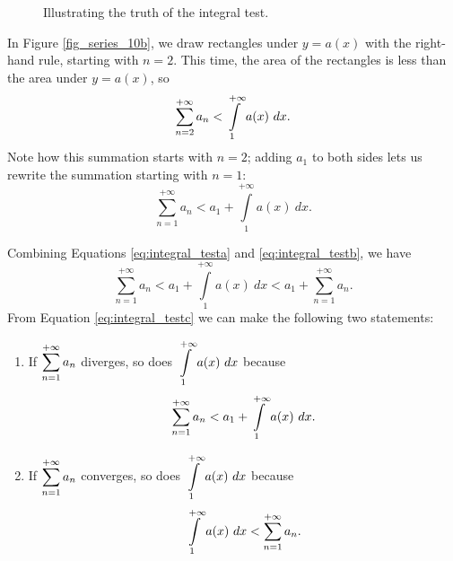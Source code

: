 \begin{figure}
\centering
\qquad
{}
\caption{Illustrating the truth of the integral test.}
\end{figure}


In Figure \ref{fig_series_10b}, we draw rectangles under $y=a(x)$ with the right-hand rule, starting with $n=2$. This time, the area of the rectangles is less than the area under $y=a(x)$, so
$$\displaystyle\sum_{n=2}^{+\infty} a_n < \int\limits_1^{+\infty} a(x)\ dx.$$ Note how this summation starts with $n=2$; adding $a_1$ to both sides lets us rewrite the summation starting with $n=1$:
\begin{equation}\sum_{n=1}^{+\infty} a_n < a_1 +\int\limits_1^{+\infty} a(x)\ dx.\label{eq:integral_testb}
\end{equation} 

Combining Equations \eqref{eq:integral_testa} and \eqref{eq:integral_testb}, we have
\begin{equation}\sum_{n=1}^{+\infty} a_n< a_1 +\int\limits_1^{+\infty} a(x)\ dx < a_1 + \sum_{n=1}^{+\infty} a_n.\label{eq:integral_testc}\end{equation}
From Equation \eqref{eq:integral_testc} we can make the following two statements:
\begin{enumerate}
	\item If $\displaystyle \sum_{n=1}^{+\infty} a_n$ diverges, so does $\displaystyle\int\limits_1^{+\infty} a(x)\ dx$ because 
	$$\displaystyle \sum_{n=1}^{+\infty} a_n < a_1 +\int\limits_1^{+\infty} a(x)\ dx.$$
	\item	If $\displaystyle \sum_{n=1}^{+\infty} a_n$ converges, so does $\displaystyle\int\limits_1^{+\infty} a(x)\ dx$ because 
	$$\displaystyle \displaystyle \int\limits_1^{+\infty} a(x)\ dx < \sum_{n=1}^{+\infty} a_n.$$
\end{enumerate}
\fi

